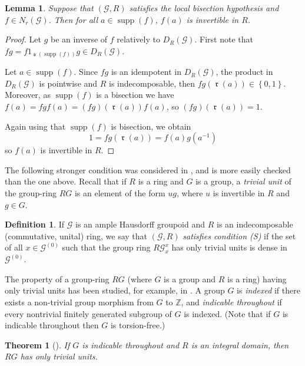 \documentclass[letter,11pt]{amsart}
\theoremstyle{plain}		\newtheorem{theorem}[generalnumbering]{Theorem}
\theoremstyle{plain}		\newtheorem{corollary}[generalnumbering]{Corollary}
\theoremstyle{definition}		\newtheorem{definition}[generalnumbering]{Definition}
\theoremstyle{definition}		\newtheorem{example}[generalnumbering]{Example}
\theoremstyle{plain}		\newtheorem{proposition}[generalnumbering]{Proposition}
\theoremstyle{plain}		\newtheorem{lemma}[generalnumbering]{Lemma}
\theoremstyle{plain}    \newtheorem{plainstyle}[generalnumbering]{\namefordifferentenvironment}
\theoremstyle{plain}    \newtheorem*{plainstyle*}{\namefordifferentenvironment}
\theoremstyle{definition}    \newtheorem{definitionstyle}[generalnumbering]{\namefordifferentenvironment}
\theoremstyle{definition}    \newtheorem*{definitionstyle*}{\namefordifferentenvironment}
\DeclareMathOperator{\supp}{supp}
\DeclareMathOperator{\so}{\mathfrak{s}}
\DeclareMathOperator{\ra}{\mathfrak{r}}
\begin{document}
\begin{lemma}\label{lemmaformofnrgforlocalbisectionhypothesis}
	Suppose that $(\mathcal{G},R)$ satisfies the local bisection hypothesis and $f\in N_r(\mathcal{G})$. Then for all $a\in\supp(f)$, $f(a)$ is invertible in $R$.
\end{lemma}
\begin{proof}
	Let $g$ be an inverse of $f$ relatively to $D_R(\mathcal{G})$. First note that $fg=f1_{\so(\supp(f))}g\in D_R(\mathcal{G})$.
	
	Let $a\in\supp(f)$. Since $fg$ is an idempotent in $D_R(\mathcal{G})$,  the product in $D_R(\mathcal{G})$ is pointwise and $R$ is indecomposable, then $fg(\ra(a))\in\left\{0,1\right\}$. Moreover, as $\supp(f)$ is a bisection we have $f(a)=fgf(a)=(fg)(\ra(a))f(a)$, so $(fg)(\ra(a))=1$.
	
	Again using that $\supp(f)$ is bisection, we obtain
	\[1=fg(\ra(a))=f(a)g(a^{-1})\]
	so $f(a)$ is invertible in $R$.\qedhere
\end{proof}

The following stronger condition was considered in \cite{carlsenrout2017}, and is more easily checked than the one above. Recall that if $R$ is a ring and $G$ is a group, a \emph{trivial unit} of the group-ring $RG$ is an element of the form $ug$, where $u$ is invertible in $R$ and $g\in G$.

\begin{definition}
	If $\mathcal{G}$ is an ample Hausdorff groupoid and $R$ is an indecomposable (commutative, unital) ring, we say that $(\mathcal{G},R)$ \emph{satisfies condition (S)} if the set of all $x\in\mathcal{G}^{(0)}$ such that the group ring $R\mathcal{G}_x^x$ has only trivial units is dense in $\mathcal{G}^{(0)}$.
\end{definition}

The property of a group-ring $RG$ (where $G$ is a group and $R$ is a ring) having only trivial units has been studied, for example, in \cite{MR0002137}. A group $G$ is \emph{indexed} if there exists a non-trivial group morphism from $G$ to $\mathbb{Z}$, and \emph{indicable throughout} if every nontrivial finitely generated subgroup of $G$ is indexed. (Note that if $G$ is indicable throughout then $G$ is torsion-free.)

\begin{theorem}[{\cite[Theorem 13]{MR0002137}}]
	If $G$ is indicable throughout and $R$ is an integral domain, then $RG$ has only trivial units.
\end{theorem}
\end{document}
